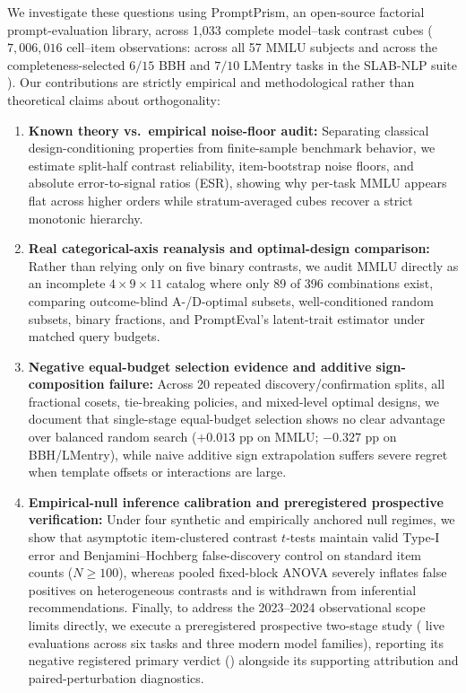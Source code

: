 \documentclass[11pt,a4paper]{article}
\newcommand{\method}{PromptPrism}
\begin{document}
We investigate these questions using \method{}, an open-source factorial prompt-evaluation library, across 1,033 complete model--task contrast cubes ($7{,}006{,}016$ cell--item observations: \CohortOneObs{} across all 57 MMLU subjects \citep{hendrycks2021measuring,polo2024efficient} and \CohortTwoObs{} across the completeness-selected $6/15$ BBH \citep{suzgun2023challenging} and $7/10$ LMentry \citep{efrat2023lmentry} tasks in the SLAB-NLP suite \citep{mizrahi2024state,habba2025dove}). Our contributions are strictly empirical and methodological rather than theoretical claims about orthogonality:
\begin{enumerate}[leftmargin=*,nosep]
    \item \textbf{Known theory vs.\ empirical noise-floor audit:} Separating classical design-conditioning properties from finite-sample benchmark behavior, we estimate split-half contrast reliability, item-bootstrap noise floors, and absolute error-to-signal ratios (ESR), showing why per-task MMLU appears flat across higher orders while stratum-averaged cubes recover a strict monotonic hierarchy.
    \item \textbf{Real categorical-axis reanalysis and optimal-design comparison:} Rather than relying only on five binary contrasts, we audit MMLU directly as an incomplete $4 \times 9 \times 11$ catalog where only 89 of 396 combinations exist, comparing outcome-blind A-/D-optimal subsets, well-conditioned random subsets, binary fractions, and PromptEval's latent-trait estimator \citep{polo2024efficient} under matched query budgets.
    \item \textbf{Negative equal-budget selection evidence and additive sign-composition failure:} Across 20 repeated discovery/confirmation splits, all fractional cosets, tie-breaking policies, and mixed-level optimal designs, we document that single-stage equal-budget selection shows no clear advantage over balanced random search ($+0.013\text{ pp}$ on MMLU; $-0.327\text{ pp}$ on BBH/LMentry), while naive additive sign extrapolation suffers severe regret when template offsets or interactions are large.
    \item \textbf{Empirical-null inference calibration and preregistered prospective verification:} Under four synthetic and empirically anchored null regimes, we show that asymptotic item-clustered contrast $t$-tests maintain valid Type-I error and Benjamini--Hochberg false-discovery control on standard item counts ($N \ge 100$), whereas pooled fixed-block ANOVA severely inflates false positives on heterogeneous contrasts and is withdrawn from inferential recommendations. Finally, to address the 2023--2024 observational scope limits directly, we execute a preregistered prospective two-stage study (\RealVFourTotalCalls{} live evaluations across six tasks and three modern model families), reporting its negative registered primary verdict (\RealVFourVerdictCode{}) alongside its supporting attribution and paired-perturbation diagnostics.
\end{enumerate}
\end{document}
